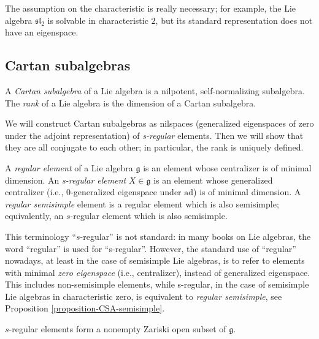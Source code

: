\begin{remark}
 \label{remark-Lie-positive-characteristic}
The assumption on the characteristic is really necessary; for example, the Lie algebra $\mathfrak{sl}_2$ is solvable in characteristic $2$, but its standard representation does not have an eigenspace.
\end{remark}

\subsection{Cartan subalgebras}
\label{subsection-CSA}

\begin{definition}
 \label{definition-CSA}
A {\it Cartan subalgebra} of a Lie algebra is a nilpotent, self-normalizing subalgebra. The {\it rank} of a Lie algebra is the dimension of a Cartan subalgebra.
\end{definition}

We will construct Cartan subalgebras as nilspaces (generalized eigenspaces of zero under the adjoint representation) of \emph{s-regular} elements. Then we will show that they are all conjugate to each other; in particular, the rank is uniquely defined.

\begin{definition}
\label{definition-regular}
 A {\it regular element}  of a Lie algebra $\mathfrak g$ is an element whose centralizer is of minimal dimension. 
 An {\it s-regular element} $X\in\mathfrak g$ is an element whose generalized centralizer (i.e., $0$-generalized eigenspace under $\text{ad}$) is of minimal dimension. A {\it regular semisimple} element is a regular element which is also semisimple; equivalently, an $s$-regular element which is also semisimple.
\end{definition}

This terminology ``$s$-regular'' is not standard: in many books on Lie algebras, the word ``regular'' is used for ``s-regular''. However, the standard use of ``regular'' nowadays, at least in the case of semisimple Lie algebras, is to refer to elements with minimal \emph{zero eigenspace} (i.e., centralizer), instead of generalized eigenspace. This includes non-semisimple elements, while s-regular, in the case of semisimple Lie algebras in characteristic zero, is equivalent to \emph{regular semisimple}, see Proposition \ref{proposition-CSA-semisimple}.



\begin{lemma}
\label{lemma-sregular-exist}
$s$-regular elements form a nonempty Zariski open subset of $\mathfrak g$. 
\end{lemma}

